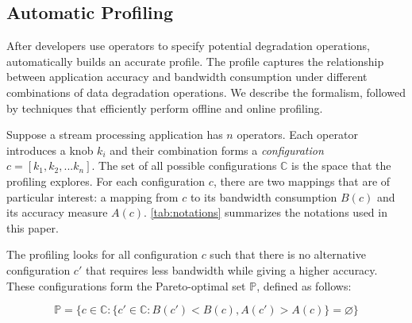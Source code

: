 \subsection{Automatic Profiling}
\label{sec:automatic-profiling}

After developers use \maybe{} operators to specify potential degradation
operations, \sysname{} automatically builds an accurate profile. The profile
captures the relationship between application accuracy and bandwidth consumption
under different combinations of data degradation operations. We describe the
formalism, followed by techniques that efficiently perform offline and online
profiling.

 Suppose a stream processing application has $n$
\maybe{} operators. Each operator introduces a knob $k_i$ and their combination
forms a \textit{configuration} $c = [k_{1}, k_{2}, ... k_{n}]$. The set of all
possible configurations $\mathbb{C}$ is the space that the profiling
explores. For each configuration $c$, there are two mappings that are of
particular interest: a mapping from $c$ to its bandwidth consumption $B(c)$ and
its accuracy measure $A(c)$. \autoref{tab:notations} summarizes the notations
used in this paper.

The profiling looks for all configuration $c$ such that there is no alternative
configuration $c'$ that requires less bandwidth while giving a higher
accuracy. These configurations form the Pareto-optimal set $\mathbb{P}$, defined
as follows:

{\small \vspace{-1em}
  \begin{equation}
  \mathbb{P} = \{ c \in \mathbb{C} : \{ c' \in \mathbb{C}: B(c') < B(c),
  A(c') > A(c) \} = \varnothing\}
  \label{eq:pareto}
\end{equation}
}%

